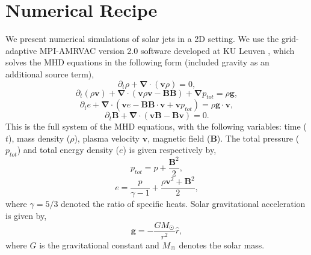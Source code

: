 \documentclass[12pt]{ociamthesis}
\newcommand{\bs}[1]{\boldsymbol{#1}}
\newcommand{\bn}{\boldsymbol{\nabla}}
\begin{document}
\section{Numerical Recipe}
\label{sec:Numerical}
We present numerical simulations of solar jets in a 2D setting. We use the grid-adaptive MPI-AMRVAC version 2.0 software developed at KU Leuven \citep{Xia_2017,Keppens_2012,Porth_2014}, which solves the MHD equations in the following form (included gravity as an additional source term),
\begin{equation} \label{eq1}
\partial_t \rho + \bn \cdot (\bs{v} \rho) = 0 ,
\end{equation}   
\begin{equation}\label{eq2}
\partial_t (\rho \bs{v})  + \bn \cdot ( \bs{v} \rho \bs{v} - \bs{BB}) + \bn p_{tot} = \rho \bs{g},
\end{equation}
\begin{equation}\label{eq3}
\partial_t e + \bn \cdot (\bs{v} e - \bs{BB}\cdot\bs{v}+\bs{v}p_{tot}) = \rho \bs{g} \cdot \bs{v} ,
\end{equation}
\begin{equation}\label{eq4}
\partial_t \bs{B} + \bn \cdot (\bs{vB}-\bs{Bv} ) = 0 .
\end{equation}
This is the full system of the MHD equations, with the following variables: time ($t$), mass density ($\rho$), plasma velocity $\bs{v}$, magnetic field ($\bs{B}$). The total pressure ($p_{tot}$) and total energy density ($e$) is given respectively by,
\begin{equation}
p_{tot} = p+\frac{\bs{B}^2}{2},
\end{equation}
\begin{equation}
e = \frac{p}{\gamma-1}+ \frac{\rho \bs{v}^2+\bs{B}^2}{2},
\end{equation}
where $\gamma=5/3$ denoted the ratio of specific heats. Solar gravitational acceleration is given by,
\begin{equation}
\bs{g}=-\frac{GM_{\astrosun}}{r^2}\hat{r},
\end{equation}
where $G$ is the gravitational constant and $M_{\astrosun}$ denotes the solar mass. 
\end{document}
